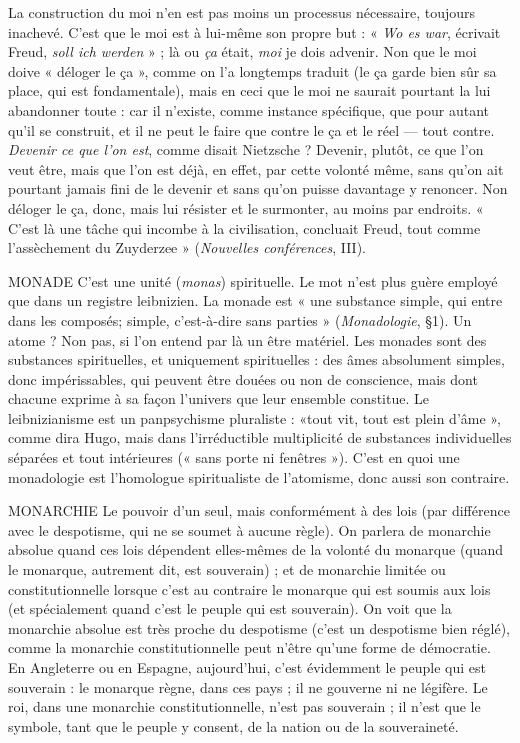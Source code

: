 La construction du moi n’en est pas moins un processus nécessaire, toujours inachevé.
C’est que le moi est à lui-même son propre but : « {\it Wo es war},
écrivait Freud, {\it soll ich werden} » ; là ou {\it ça} était, {\it moi} je dois advenir. Non que le
moi doive « déloger le ça », comme on l’a longtemps traduit (le ça garde bien
sûr sa place, qui est fondamentale), mais en ceci que le moi ne saurait pourtant
la lui abandonner toute : car il n'existe, comme instance spécifique, que pour
autant qu'il se construit, et il ne peut le faire que contre le ça et le réel — tout
contre. {\it Devenir ce que l'on est}, comme disait Nietzsche ? Devenir, plutôt, ce que
l’on veut être, mais que l’on est déjà, en effet, par cette volonté même, sans
qu’on ait pourtant jamais fini de le devenir et sans qu’on puisse davantage y
renoncer. Non déloger le ça, donc, mais lui résister et le surmonter, au moins
par endroits. « C’est là une tâche qui incombe à la civilisation, concluait Freud,
tout comme l’assèchement du Zuyderzee » ({\it Nouvelles conférences}, III).

MONADE C'est une unité ({\it monas}) spirituelle. Le mot n’est plus guère
employé que dans un registre leibnizien. La monade est « une
substance simple, qui entre dans les composés; simple, c’est-à-dire sans
parties » ({\it Monadologie}, \S 1). Un atome ? Non pas, si l’on entend par là un être
matériel. Les monades sont des substances spirituelles, et uniquement
spirituelles : des âmes absolument simples, donc impérissables, qui peuvent être
douées ou non de conscience, mais dont chacune exprime à sa façon l’univers
que leur ensemble constitue. Le leibnizianisme est un panpsychisme pluraliste :
«tout vit, tout est plein d’âme », comme dira Hugo, mais dans l’irréductible
multiplicité de substances individuelles séparées et tout intérieures (« sans porte
ni fenêtres »). C’est en quoi une monadologie est l’homologue spiritualiste de
l’atomisme, donc aussi son contraire.

MONARCHIE Le pouvoir d’un seul, mais conformément à des lois (par différence
avec le despotisme, qui ne se soumet à aucune règle).
On parlera de monarchie absolue quand ces lois dépendent elles-mêmes de la
volonté du monarque (quand le monarque, autrement dit, est souverain) ; et de
monarchie limitée ou constitutionnelle lorsque c’est au contraire le monarque
qui est soumis aux lois (et spécialement quand c’est le peuple qui est souverain).
On voit que la monarchie absolue est très proche du despotisme (c’est un
despotisme bien réglé), comme la monarchie constitutionnelle peut n'être
qu’une forme de démocratie. En Angleterre ou en Espagne, aujourd’hui, c’est
évidemment le peuple qui est souverain : le monarque règne, dans ces pays ; il
ne gouverne ni ne légifère. Le roi, dans une monarchie constitutionnelle, n’est
pas souverain ; il n’est que le symbole, tant que le peuple y consent, de la
nation ou de la souveraineté.

